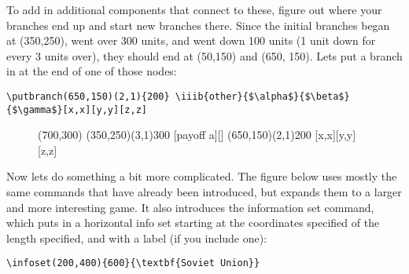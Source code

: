 \documentclass{article}
\begin{document}
\clearpage

To add in additional components that connect to these, figure out where your branches end up and start new branches there.  Since the initial branches began at (350,250), went over 300 units, and went down 100 units (1 unit down for every 3 units over), they should end at (50,150) and (650, 150).  Lets put a branch in at the end of one of those nodes:
\begin{verbatim}
\putbranch(650,150)(2,1){200} \iiib{other}{$\alpha$}{$\beta$}{$\gamma$}[x,x][y,y][z,z]
\end{verbatim}


\begin{figure}[h]
\begin{footnotesize}
\begin{center}
\begin{egame}(700,300)
\putbranch(350,250)(3,1){300} [payoff a][]
\putbranch(650,150)(2,1){200} [x,x][y,y][z,z]
\end{egame}
\end{center}
\end{footnotesize}
\end{figure}



Now lets do something a bit more complicated.  The figure below uses mostly the same commands that have already been introduced, but expands them to a larger and more interesting game.  It also introduces the information set command, which puts in a horizontal info set starting at the coordinates specified of the length specified, and with a label (if you include one):
\begin{verbatim}
\infoset(200,400){600}{\textbf{Soviet Union}}
\end{verbatim}
\end{document}
